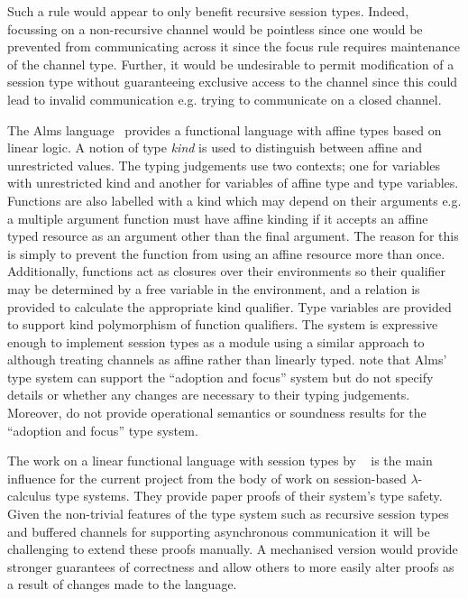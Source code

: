 \documentclass{mprop}
\newcommand{\1}{\textbf{1}\xspace}
\begin{document}
Such a rule would appear to only benefit recursive session types. Indeed, focussing on a non-recursive channel would be pointless since one would be prevented from communicating across it since the focus rule requires maintenance of the channel type. Further, it would be undesirable to permit modification of a session type without guaranteeing exclusive access to the channel since this could lead to invalid communication e.g. trying to communicate on a closed channel.

The Alms language~\cite{Aldrich:2009} provides a functional language with affine types based on linear logic. A notion of type \textit{kind} is used to distinguish between affine and unrestricted values. The typing judgements use two contexts; one for variables with unrestricted kind and another for variables of affine type and type variables. Functions are also labelled with a kind which may depend on their arguments e.g. a multiple argument function must have affine kinding if it accepts an affine typed resource as an argument other than the final argument. The reason for this is simply to prevent the function from using an affine resource more than once. Additionally, functions act as closures over their environments so their qualifier may be determined by a free variable in the environment, and a relation is provided to calculate the appropriate kind qualifier. Type variables are provided to support kind polymorphism of function qualifiers. The system is expressive enough to implement session types as a module using a similar approach to \citeauthor{Gay:2010:LAST}~\cite{Gay:2010:LAST} although treating channels as affine rather than linearly typed. \citeauthor{Aldrich:2009} note that Alms' type system can support the ``adoption and focus'' system but do not specify details or whether any changes are necessary to their typing judgements. Moreover, \citeauthor{Fahndrich:2002} do not provide operational semantics or soundness results for the ``adoption and focus'' type system.

The work on a linear functional language with session types by \citeauthor{Gay:2010:LAST}~\cite{Gay:2010:LAST} is the main influence for the current project from the body of work on session-based $\lambda$-calculus type systems. They provide paper proofs of their system's type safety. Given the non-trivial features of the type system such as recursive session types and buffered channels for supporting asynchronous communication it will be challenging to extend these proofs manually. A mechanised version would provide stronger guarantees of correctness and allow others to more easily alter proofs as a result of changes made to the language.
\end{document}
